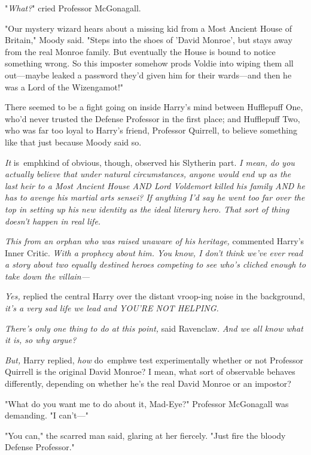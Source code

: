 "\emph{What?}" cried Professor McGonagall.

"Our mystery wizard hears about a missing kid from a Most Ancient House of 
Britain," Moody said. "Steps into the shoes of 'David Monroe', but stays away 
from the real Monroe family. But eventually the House is bound to notice 
something wrong. So this imposter somehow prods Voldie into wiping them all 
out---maybe leaked a password they'd given him for their wards---and then he 
was a Lord of the Wizengamot!"

There seemed to be a fight going on inside Harry's mind between Hufflepuff One, 
who'd never trusted the Defense Professor in the first place; and Hufflepuff 
Two, who was far too loyal to Harry's friend, Professor Quirrell, to believe 
something like that just because Moody said so.

\emph{It} is\ emph{kind of obvious, though,} observed his Slytherin part. 
\emph{I mean, do you actually believe that under natural circumstances, anyone 
would end up as the last heir to a Most Ancient House AND Lord Voldemort killed 
his family AND he has to avenge his martial arts sensei? If anything I'd say he 
went too far over the top in setting up his new identity as the ideal literary 
hero. That sort of thing doesn't happen in real life.} 

\emph{This from an orphan who was raised unaware of his heritage,} commented 
Harry's Inner Critic. \emph{With a prophecy about him. You know, I don't think 
we've ever read a story about two equally destined heroes competing to see 
who's cliched enough to take down the villain---}

\emph{Yes,} replied the central Harry over the distant vroop-ing noise in the 
background, \emph{it's a very sad life we lead and YOU'RE NOT HELPING.}

\emph{There's only one thing to do at this point,} said Ravenclaw. \emph{And we 
all know what it is, so why argue?}

\emph{But,} Harry replied, \emph{how} do\ emph{we test experimentally whether 
or not Professor Quirrell is the original David Monroe? I mean, what sort of 
observable behaves differently, depending on whether he's the real David Monroe 
or an impostor?}

"What do you want me to do about it, Mad-Eye?" Professor McGonagall was 
demanding. "I can't---"

"You can," the scarred man said, glaring at her fiercely. "Just fire the bloody 
Defense Professor."

